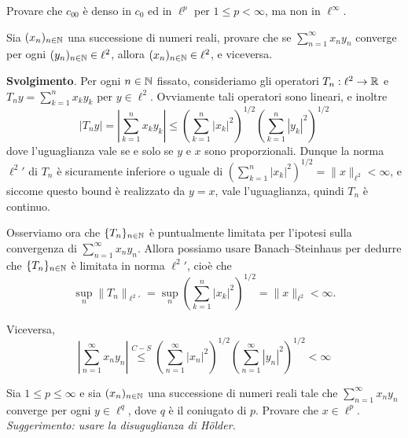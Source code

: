 \begin{exercise}
\label{ex:c00_density}
	Provare che $c_{00}$ è denso in $c_0$ ed in $\ell^p$ per $1 \leq p < \infty$, ma non in $\ell^\infty$.
\end{exercise}
\begin{exercise}
	Sia $(x_n)_{n \in \mathbb{N}}$ una successione di numeri reali, provare che se $\sum_{n=1}^\infty x_n y_n$ converge per ogni $(y_n)_{n \in \mathbb{N}} \in \ell^2$, allora $(x_n)_{n \in \mathbb{N}} \in \ell^2$, e viceversa.

	\noindent\textbf{Svolgimento}. Per ogni $n \in \mathbb{N}$ fissato, consideriamo gli operatori $T_n : \ell^2 \to \mathbb{R}$ e $T_ny = \sum_{k=1}^n x_ky_k$ per $y \in \ell^2$. Ovviamente tali operatori sono lineari, e inoltre
	\begin{equation*}
		|T_ny| = \left| \sum_{k=1}^n x_k y_k \right| \leq \left( \sum_{k=1}^n |x_k|^2\right)^{1/2} \left( \sum_{k=1}^n |y_k|^2 \right)^{1/2}
	\end{equation*}
	dove l'uguaglianza vale se e solo se $y$ e $x$ sono proporzionali. Dunque la norma ${\ell^2}'$ di $T_n$ è sicuramente inferiore o uguale di $\left( \sum_{k=1}^n |x_k|^2\right)^{1/2} = \|x\|_{\ell^2} < \infty$, e siccome questo bound è realizzato da $y=x$, vale l'uguaglianza, quindi $T_n$ è continuo.

	Osserviamo ora che $\{T_n\}_{n \in \mathbb{N}}$ è puntualmente limitata per l'ipotesi sulla convergenza di $\sum_{n=1}^\infty x_n y_n$. Allora possiamo usare Banach--Steinhaus per dedurre che $\{T_n\}_{n \in \mathbb{N}}$ è limitata in norma ${\ell^2}'$, cioè che
	\begin{equation*}
		\sup_n \|T_n\|_{{\ell^2}'} = \sup_n \left( \sum_{k=1}^n |x_k|^2 \right)^{1/2} = \|x\|_{\ell^2} < \infty.
	\end{equation*}

	Viceversa,
	\begin{equation*}
		\left| \sum_{n=1}^\infty x_n y_n \right| \overset{C-S}\leq \left( \sum_{n=1}^\infty |x_n|^2\right)^{1/2} \left( \sum_{n=1}^\infty |y_n|^2 \right)^{1/2} < \infty
	\end{equation*}
\end{exercise}

\begin{exercise}
	Sia $1 \leq p \leq \infty$ e sia $(x_n)_{n \in \mathbb{N}}$ una successione di numeri reali tale che $\sum_{n=1}^\infty x_ny_n$ converge per ogni $y \in \ell^q$, dove $q$ è il coniugato di $p$. Provare che $x \in \ell^p$. \emph{Suggerimento: usare la disuguglianza di H\"older.}
\end{exercise}

